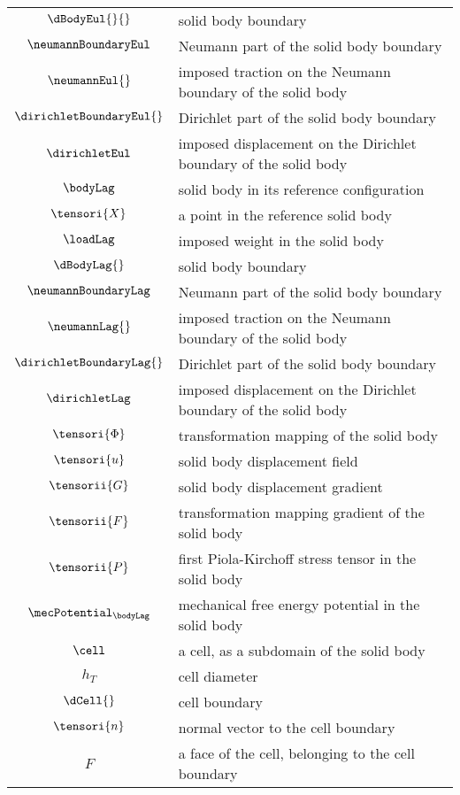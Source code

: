 \begin{longtable}{c l}
    \\
    $\dBodyEul{}{}$ & solid body boundary
    \\
    $\neumannBoundaryEul$ & Neumann part of the solid body boundary
    \\
    $\neumannEul{}$ & imposed traction on the Neumann boundary of the solid body
    \\
    $\dirichletBoundaryEul{}$ & Dirichlet part of the solid body boundary
    \\
    $\dirichletEul$ & imposed displacement on the Dirichlet boundary of the solid body
    \\
    $\bodyLag$ & solid body in its reference configuration
    \\
    $\tensori{X}$ & a point in the reference solid body
    \\
    $\loadLag$ & imposed weight in the solid body
    \\
    $\dBodyLag{}$ & solid body boundary
    \\
    $\neumannBoundaryLag$ & Neumann part of the solid body boundary
    \\
    $\neumannLag{}$ & imposed traction on the Neumann boundary of the solid body
    \\
    $\dirichletBoundaryLag{}$ & Dirichlet part of the solid body boundary
    \\
    $\dirichletLag$ & imposed displacement on the Dirichlet boundary of the solid body
    \\
    $\tensori{\Phi}$ & transformation mapping of the solid body
    \\
    $\tensori{u}$ & solid body displacement field
    \\
    $\tensorii{G}$ & solid body displacement gradient
    \\
    $\tensorii{F}$ & transformation mapping gradient of the solid body
    \\
    $\tensorii{P}$ & first Piola-Kirchoff stress tensor in the solid body 
    \\
    $\mecPotential_{\bodyLag}$ & mechanical free energy potential in the solid body 
    \\
    $\cell$ & a cell, as a subdomain of the solid body
    \\
    $h_T$ & cell diameter
    \\
    $\dCell{}$ & cell boundary
    \\
    $\tensori{n}$ & normal vector to the cell boundary
    \\
    $F$ & a face of the cell, belonging to the cell boundary

\end{longtable}
